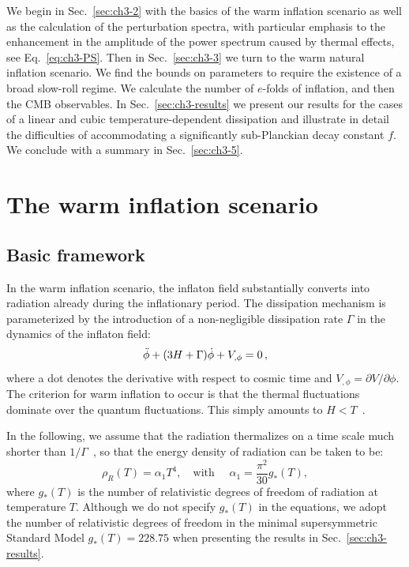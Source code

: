 We begin in Sec.~\ref{sec:ch3-2} with the basics of the warm inflation scenario as well as the calculation of the perturbation spectra, with particular emphasis to the enhancement in the amplitude of the power spectrum caused by thermal effects, see Eq.~\ref{eq:ch3-PS}. Then in Sec.~\ref{sec:ch3-3} we turn to the warm natural inflation scenario. We find the bounds on parameters to require the existence of a broad slow-roll regime. We calculate the number of $e$-folds of inflation, and then the CMB observables. In Sec.~\ref{sec:ch3-results} we present our results for the cases of a linear and cubic temperature-dependent dissipation and illustrate in detail the difficulties of accommodating a significantly sub-Planckian decay constant $f$. We conclude with a summary in Sec.~\ref{sec:ch3-5}.

\section{The warm inflation scenario
\label{sec:ch3-2}}
\subsection{Basic framework}

In the warm inflation scenario, the inflaton field substantially converts into radiation already during the inflationary period. The dissipation mechanism is parameterized by the introduction of a non-negligible dissipation rate $\Gamma$ in the dynamics of the inflaton field:
\begin{equation}
    \Ddot{\phi}+(3H+\Gamma)\dot{\phi}+V_{,\phi}=0\,,
    \label{eq:ch3-2.1}
\end{equation}
where a dot denotes the derivative with respect to cosmic time and $V_{,\phi}=\partial V/\partial \phi$. The criterion for warm inflation to occur is that the thermal fluctuations dominate over the quantum fluctuations. This simply amounts to $H<T$~\cite{Berera:1995ie}.

In the following, we assume that the radiation thermalizes on a time scale much shorter than $1/\Gamma$~\cite{Berera:1995wh,Berera:1995ie}, so that the energy density of radiation can be taken to be:
\begin{equation}
    \rho_R(T)=\alpha_1 T^4, \quad \text{with } \quad \alpha_1=\frac{\pi^2}{30}g_{*}(T), \label{eq:ch3-2.2}
\end{equation}
where $g_{*}(T)$ is the number of relativistic degrees of freedom of radiation at temperature $T$. Although we do not specify $g_{*}(T)$ in the equations, we adopt the number of relativistic degrees of freedom in the minimal supersymmetric Standard Model $g_{*}(T) = 228.75$ when presenting the results in Sec.~\ref{sec:ch3-results}.

